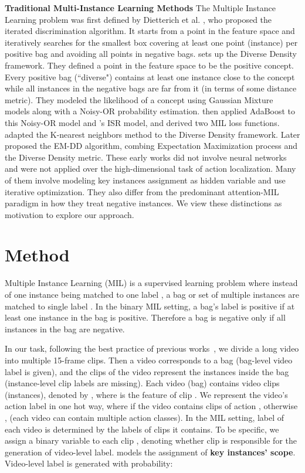 \documentclass[runningheads]{llncs}
\begin{document}
\smallskip
\textbf{Traditional Multi-Instance Learning Methods}    
The Multiple Instance Learning problem was first defined by Dietterich et al. \cite{rectanglesMIL}, who proposed the iterated discrimination algorithm. It starts from a point in the feature space and iteratively searches for the smallest box covering at least one point (instance) per positive bag and avoiding all points in negative bags. \cite{DDFramework} sets up the Diverse Density framework. They defined a point in the feature space to be the positive concept. Every positive bag (``diverse") contains at least one instance close to the concept while all instances in the negative bags are far from it (in terms of some distance metric). They modeled the likelihood of a concept using Gaussian Mixture models along with a Noisy-OR probability estimation. \cite{Boosting} then applied AdaBoost to this Noisy-OR model and \cite{ISR}'s ISR model, and derived two MIL loss functions. \cite{Dooly01multiple-instancelearning} adapted the K-nearest neighbors method to the Diverse Density framework. Later \cite{EM_DD} proposed the EM-DD algorithm, combing Expectation Maximization process and the Diverse Density metric. These early works did not involve neural networks and were not applied over the high-dimensional task of action localization. Many of them involve modeling key instances assignment as hidden variable and use iterative optimization. They also differ from the predominant attention-MIL paradigm in how they treat negative instances. We view these distinctions as motivation to explore our approach.




 
\section{Method}


Multiple Instance Learning (MIL) is a supervised learning problem where instead of one instance  being matched to one label , a bag or set of multiple instances  are matched to single label . In the binary MIL setting, a bag's label is positive if at least one instance in the bag is positive. Therefore a bag is negative only if all instances in the bag are negative. 


\smallskip
In our task, following the best practice of previous works~\cite{nguyen2018weakly,paul2018w,wang2017untrimmednets}, we divide a long video into multiple 15-frame clips. Then a video corresponds to a bag (bag-level video label is given), and the clips of the video represent the instances inside the bag (instance-level clip labels are missing). Each video (bag) contains  video clips (instances), denoted by , where  is the feature of clip . 
We represent the video's action label in one hot way, where  if the video contains clips of action , otherwise ,  (each video can contain multiple action classes). In the MIL setting, label of each video is determined by the labels of clips it contains. To be specific, we assign a binary variable  to each clip , denoting whether clip  is responsible for the generation of video-level label.  models the assignment of \textbf{key instances’ scope}. Video-level label is generated with probability:
\end{document}
